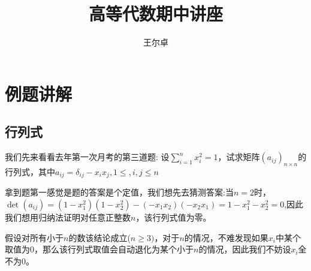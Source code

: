 \documentclass[a4paper,12pt]{ctexart}
\title{高等代数期中讲座}
\author{王尔卓}
\newenvironment{prooff}{{\noindent\it\textcolor{cyan!40!black}{Proof}:}\quad}{\par}
\begin{document}
\maketitle
\tableofcontents
\newpage
\section{例题讲解}
\subsection{行列式}
我们先来看看去年第一次月考的第三道题:
设$\sum_{i=1}^{n}x_i^2=1$，试求矩阵$(a_{ij})_{n\times n}$的行列式，其中$a_{ij}=\delta_{ij}-x_ix_j,1\le,i,j\le n$

\begin{prooff}
    拿到题第一感觉是题的答案是个定值，我们想先去猜测答案:当$n=2$时，$\det (a_{ij})=(1-x_1^2)(1-x_2^2)-(-x_1x_2)(-x_2x_1)=1-x_1^2-x_2^2=0$,因此我们想用归纳法证明对任意正整数$n$，该行列式值为零。

    假设对所有小于$n$的数该结论成立($n\ge 3)$，对于$n$的情况，不难发现如果$x_i$中某个取值为$0$，那么该行列式取值会自动退化为某个小于$n$的情况，因此我们不妨设$x_i$全不为$0$。


\end{prooff}
\end{document}

